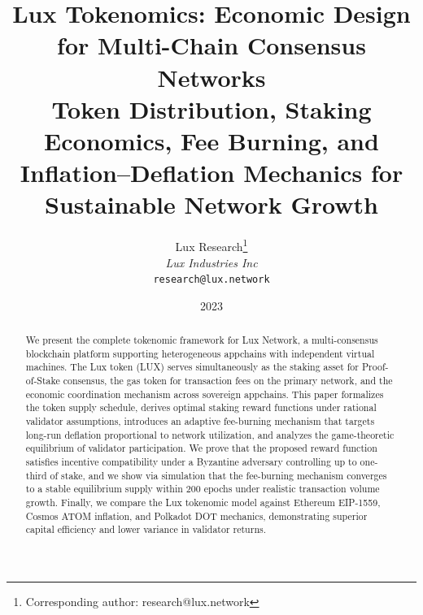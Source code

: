 \documentclass[11pt,a4paper]{article}
\title{\textbf{Lux Tokenomics: Economic Design for Multi-Chain Consensus Networks}\\[6pt]
\large Token Distribution, Staking Economics, Fee Burning, and\\Inflation--Deflation Mechanics for Sustainable Network Growth}
\author{
Lux Research\thanks{Corresponding author: research@lux.network}\\
\textit{Lux Industries Inc}\\
\texttt{research@lux.network}
}
\date{2023}
\begin{document}
\luxcoverpage

\begin{abstract}
We present the complete tokenomic framework for Lux Network, a multi-consensus blockchain platform supporting heterogeneous appchains with independent virtual machines. The Lux token (LUX) serves simultaneously as the staking asset for Proof-of-Stake consensus, the gas token for transaction fees on the primary network, and the economic coordination mechanism across sovereign appchains. This paper formalizes the token supply schedule, derives optimal staking reward functions under rational validator assumptions, introduces an adaptive fee-burning mechanism that targets long-run deflation proportional to network utilization, and analyzes the game-theoretic equilibrium of validator participation. We prove that the proposed reward function satisfies incentive compatibility under a Byzantine adversary controlling up to one-third of stake, and we show via simulation that the fee-burning mechanism converges to a stable equilibrium supply within 200 epochs under realistic transaction volume growth. Finally, we compare the Lux tokenomic model against Ethereum EIP-1559, Cosmos ATOM inflation, and Polkadot DOT mechanics, demonstrating superior capital efficiency and lower variance in validator returns.
\end{abstract}












\end{document}
